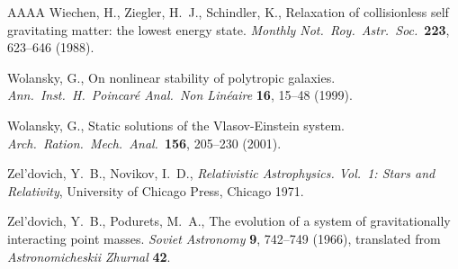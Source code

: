 \documentclass[11pt]{article}
\begin{document}
\begin{thebibliography}{AAAA}
  {\sc Wiechen, H., Ziegler, H.~J., Schindler, K.},
  Relaxation of collisionless self gravitating matter: the lowest energy state.
  {\em Monthly Not.\ Roy.\ Astr.\ Soc.}\
  {\bf 223}, 623--646 (1988).

  {\sc Wolansky, G.},
  On nonlinear stability of polytropic galaxies.
  {\em Ann.\ Inst.\ H.\ Poincar\'e Anal.\ Non Lin\'eaire}
  {\bf 16}, 15--48 (1999).

  {\sc Wolansky, G.},
  Static solutions of the Vlasov-Einstein system.
  {\em Arch.\ Ration.\ Mech.\ Anal.}\ 
  {\bf 156}, 205--230 (2001).

  {\sc Zel'dovich, Y.~B., Novikov, I.~D.},
  {\em Relativistic Astrophysics. Vol.~1: Stars and Relativity},
  University of Chicago Press, Chicago 1971.

  {\sc Zel'dovich, Y.~B., Podurets, M.~A.},
  The evolution of a system of gravitationally interacting point masses.
  {\em Soviet Astronomy}
  {\bf 9}, 742--749 (1966),
  translated from {\em Astronomicheskii Zhurnal} {\bf 42}.

\end{thebibliography}
\end{document}
